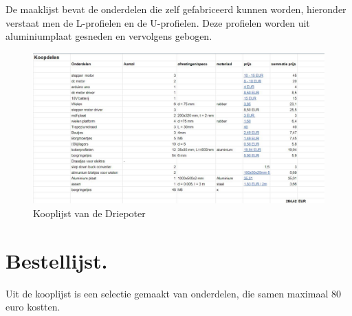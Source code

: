 De maaklijst bevat de onderdelen die zelf gefabriceerd kunnen worden, hieronder verstaat men de L-profielen en de U-profielen. Deze profielen worden uit aluminiumplaat gesneden en vervolgens gebogen. 

\vspace{\baselineskip}
\begin{figure}[H]
    \includegraphics[width = 120mm]{04_conceptdimensionering/Tabel_Kooplijst.JPG}
    \caption{Kooplijst van de Driepoter}
    \label{fig:kooplijst}
\end{figure}

\section{Bestellijst.}
Uit de kooplijst is een selectie gemaakt van onderdelen, die samen maximaal 80 euro kostten. 